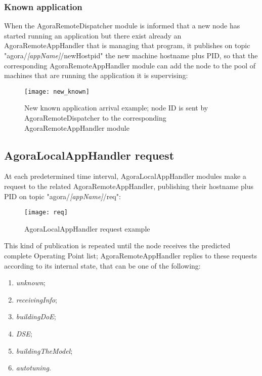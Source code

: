 \subsubsection{Known application}\label{knownApp}

When the AgoraRemoteDispatcher module is informed that a new node has started running an application but there exist already an AgoraRemoteAppHandler that is managing that program, it publishes on topic "agora/\textit{[appName]}/newHostpid" the new machine hostname plus PID, so that the corresponding Agora\-Remote\-App\-Handler module can add the node to the pool of machines that are running the application it is supervising:

\begin{figure}[H]

    \centering
    \texttt{[image: new\_known]}
    \caption[New known application arrival example]{New known application arrival example; node ID is sent by AgoraRemoteDispatcher to the corresponding AgoraRemoteAppHandler module}
    
\end{figure}





\subsection{AgoraLocalAppHandler request}\label{clientReq}

At each predetermined time interval, AgoraLocalAppHandler modules make a request to the related AgoraRemoteAppHandler, publishing their hostname plus PID on topic "agora/\textit{[appName]}/req":

\begin{figure}[H]

    \centering
    \texttt{[image: req]}
    \caption{AgoraLocalAppHandler request example}
    
\end{figure}

This kind of publication is repeated until the node receives the predicted complete Operating Point list; AgoraRemoteAppHandler replies to these requests according to its internal state, that can be one of the following:

\begin{enumerate}

    \item \textit{unknown};

    \item \textit{receivingInfo};

    \item \textit{buildingDoE};

    \item \textit{DSE};

    \item \textit{buildingTheModel};

    \item \textit{autotuning}.

\end{enumerate}


